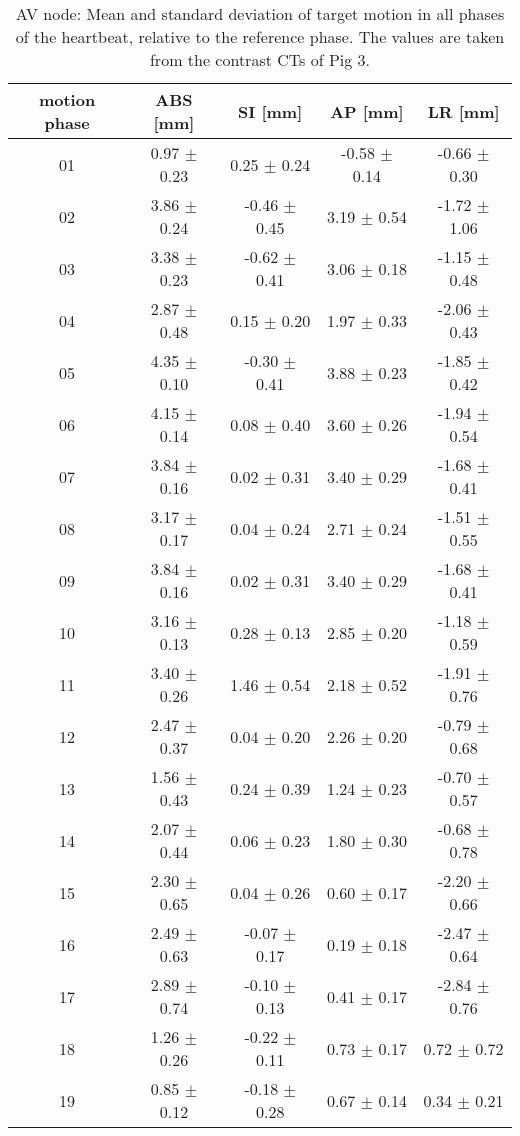 \newpage

\begin{table}[H]
  \centering
  \scriptsize
  \caption{AV node: Mean and standard deviation of target motion in all phases of the heartbeat, relative to the reference phase. The values are 
  taken from the contrast CTs of Pig 3.}
  \begin{tabular}{|c|c|c|c|c|}
    \hline\hline
    motion phase\rule{0pt}{2.6ex}\rule[-1.2ex]{0pt}{0pt} & ABS [mm] & SI [mm] & AP [mm] & LR [mm]\\
    \hline
01 &0.97 $\pm$ 0.23 &0.25 $\pm$ 0.24 &-0.58 $\pm$ 0.14 &-0.66 $\pm$ 0.30 \\
02 &3.86 $\pm$ 0.24 &-0.46 $\pm$ 0.45 &3.19 $\pm$ 0.54 &-1.72 $\pm$ 1.06 \\
03 &3.38 $\pm$ 0.23 &-0.62 $\pm$ 0.41 &3.06 $\pm$ 0.18 &-1.15 $\pm$ 0.48 \\
04 &2.87 $\pm$ 0.48 &0.15 $\pm$ 0.20 &1.97 $\pm$ 0.33 &-2.06 $\pm$ 0.43 \\
05 &4.35 $\pm$ 0.10 &-0.30 $\pm$ 0.41 &3.88 $\pm$ 0.23 &-1.85 $\pm$ 0.42 \\
06 &4.15 $\pm$ 0.14 &0.08 $\pm$ 0.40 &3.60 $\pm$ 0.26 &-1.94 $\pm$ 0.54 \\
07 &3.84 $\pm$ 0.16 &0.02 $\pm$ 0.31 &3.40 $\pm$ 0.29 &-1.68 $\pm$ 0.41 \\
08 &3.17 $\pm$ 0.17 &0.04 $\pm$ 0.24 &2.71 $\pm$ 0.24 &-1.51 $\pm$ 0.55 \\
09 &3.84 $\pm$ 0.16 &0.02 $\pm$ 0.31 &3.40 $\pm$ 0.29 &-1.68 $\pm$ 0.41 \\
10 &3.16 $\pm$ 0.13 &0.28 $\pm$ 0.13 &2.85 $\pm$ 0.20 &-1.18 $\pm$ 0.59 \\
11 &3.40 $\pm$ 0.26 &1.46 $\pm$ 0.54 &2.18 $\pm$ 0.52 &-1.91 $\pm$ 0.76 \\
12 &2.47 $\pm$ 0.37 &0.04 $\pm$ 0.20 &2.26 $\pm$ 0.20 &-0.79 $\pm$ 0.68 \\
13 &1.56 $\pm$ 0.43 &0.24 $\pm$ 0.39 &1.24 $\pm$ 0.23 &-0.70 $\pm$ 0.57 \\
14 &2.07 $\pm$ 0.44 &0.06 $\pm$ 0.23 &1.80 $\pm$ 0.30 &-0.68 $\pm$ 0.78 \\
15 &2.30 $\pm$ 0.65 &0.04 $\pm$ 0.26 &0.60 $\pm$ 0.17 &-2.20 $\pm$ 0.66 \\
16 &2.49 $\pm$ 0.63 &-0.07 $\pm$ 0.17 &0.19 $\pm$ 0.18 &-2.47 $\pm$ 0.64 \\
17 &2.89 $\pm$ 0.74 &-0.10 $\pm$ 0.13 &0.41 $\pm$ 0.17 &-2.84 $\pm$ 0.76 \\
18 &1.26 $\pm$ 0.26 &-0.22 $\pm$ 0.11 &0.73 $\pm$ 0.17 &0.72 $\pm$ 0.72 \\
19 &0.85 $\pm$ 0.12 &-0.18 $\pm$ 0.28 &0.67 $\pm$ 0.14 &0.34 $\pm$ 0.21 \\
    \hline\hline
  \end{tabular}
  \label{tab:motion:AV:Pig3}
\end{table}


